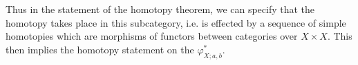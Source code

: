Thus in the statement of the homotopy theorem, we can specify that the homotopy takes place in this subcategory, i.e. is effected by a sequence of simple homotopies which are morphisms of functors between categories over $X\times X$. This then implies the homotopy statement on the $\varphi^*_{X;a,b}$.